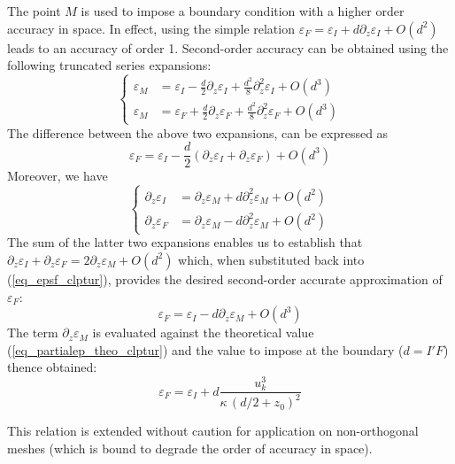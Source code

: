 The point $M$ is used to impose a boundary condition with a higher order accuracy
in space. In effect, using the simple relation
$\varepsilon_F=\varepsilon_I+d\partial_z\varepsilon_I + O(d^2)$ leads to an
accuracy of order 1.
Second-order accuracy can be obtained using the following truncated series expansions:
\begin{equation}
\left\{\begin{array}{ll}
\varepsilon_M&=\varepsilon_I-\displaystyle\frac{d}{2}\partial_z\varepsilon_I+\displaystyle\frac{d^2}{8}\partial^2_z\varepsilon_I+O(d^3)\\
\varepsilon_M&=\varepsilon_F+\displaystyle\frac{d}{2}\partial_z\varepsilon_F+\displaystyle\frac{d^2}{8}\partial^2_z\varepsilon_F+O(d^3)
\end{array}\right.
\end{equation}
The difference between the above two expansions, can be expressed as
\begin{equation}\label{eq_epsf_clptur}
\varepsilon_F=\varepsilon_I-\displaystyle\frac{d}{2}(\partial_z\varepsilon_I+\partial_z\varepsilon_F)+O(d^3)
\end{equation}
Moreover, we have
\begin{equation}
\left\{\begin{array}{ll}
\partial_z\varepsilon_I&=\partial_z\varepsilon_M+d\partial^2_z\varepsilon_M+O(d^2)\\
\partial_z\varepsilon_F&=\partial_z\varepsilon_M-d\partial^2_z\varepsilon_M+O(d^2)
\end{array}\right.
\end{equation}
The sum of the latter two expansions enables us to establish that
$\partial_z\varepsilon_I+\partial_z\varepsilon_F=2\partial_z\varepsilon_M+O(d^2)$ which, when
substituted back into (\ref{eq_epsf_clptur}), provides the desired second-order accurate
approximation of $\varepsilon_F$:
\begin{equation}
\varepsilon_F=\varepsilon_I-d\partial_z\varepsilon_M+O(d^3)
\end{equation}
The term $\partial_z\varepsilon_M$ is evaluated against the theoretical value (\ref{eq_partialep_theo_clptur})
and the value to impose at the boundary ($d=I'F$) thence obtained:
\begin{equation}
\varepsilon_F=\varepsilon_I+d\displaystyle\frac{ u_k^3}{\kappa\, (d/2+ z_0)^2}
\end{equation}


This relation is extended without caution for application on non-orthogonal meshes
(which is bound to degrade the order of accuracy in space).

